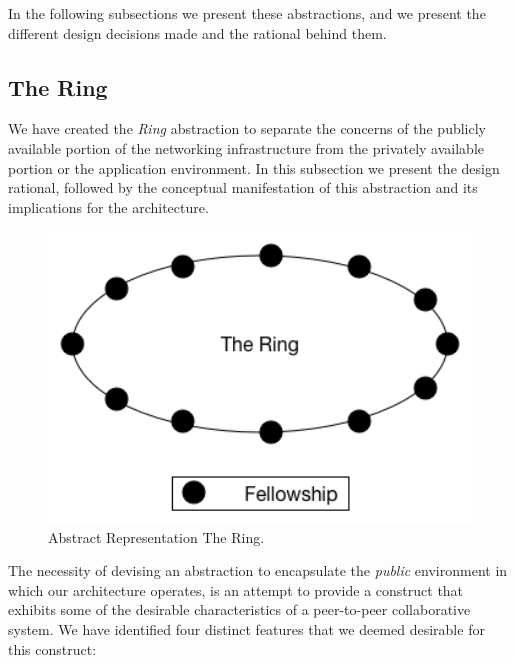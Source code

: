 \documentclass[12pt, titlepage]{uo_temp}
\begin{document}
     In the following subsections we present these abstractions, and we present the
     different design decisions made and the rational behind them.

     \subsection{The Ring}\label{arch_ring}
     We have created the \emph{Ring} abstraction to separate the concerns of the publicly
     available portion of the networking infrastructure from the privately available
     portion or the application environment. In this subsection we present the design
     rational, followed by the conceptual manifestation of this abstraction and its
     implications for the architecture.

     \begin{figure}[h]
       \centering
       \includegraphics[width=125mm]{images/arch_ring.png}
       \caption{Abstract Representation The Ring.}
     \end{figure}

     The necessity of devising an abstraction to encapsulate the \emph{public} environment
     in which our architecture operates, is an attempt to provide a construct that
     exhibits some of the desirable characteristics of a peer-to-peer collaborative
     system. We have identified four distinct features that we deemed desirable for this
     construct:
\end{document}
